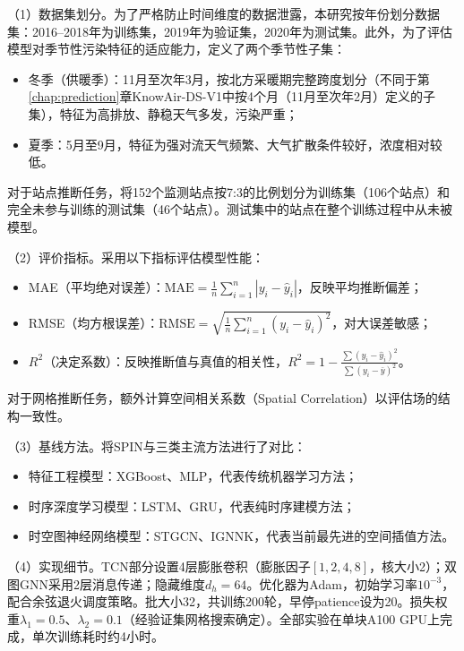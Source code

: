 （1）数据集划分。为了严格防止时间维度的数据泄露，本研究按年份划分数据集：2016--2018年为训练集，2019年为验证集，2020年为测试集。此外，为了评估模型对季节性污染特征的适应能力，定义了两个季节性子集：

\begin{itemize}
    \item 冬季（供暖季）：11月至次年3月，按北方采暖期完整跨度划分（不同于第\ref{chap:prediction}章KnowAir-DS-V1中按4个月（11月至次年2月）定义的子集），特征为高排放、静稳天气多发，\PM 污染严重；
    \item 夏季：5月至9月，特征为强对流天气频繁、大气扩散条件较好，\PM 浓度相对较低。
\end{itemize}

对于站点推断任务，将152个监测站点按7:3的比例划分为训练集（106个站点）和完全未参与训练的测试集（46个站点）。测试集中的站点在整个训练过程中从未被模型。

（2）评价指标。采用以下指标评估模型性能：

\begin{itemize}
    \item MAE（平均绝对误差）：$\text{MAE} = \frac{1}{n}\sum_{i=1}^{n}|y_i - \hat{y}_i|$，反映平均推断偏差；
    \item RMSE（均方根误差）：$\text{RMSE} = \sqrt{\frac{1}{n}\sum_{i=1}^{n}(y_i - \hat{y}_i)^2}$，对大误差敏感；
    \item $R^2$（决定系数）：反映推断值与真值的相关性，$R^2 = 1 - \frac{\sum(y_i-\hat{y}_i)^2}{\sum(y_i-\bar{y})^2}$。
\end{itemize}

对于网格推断任务，额外计算空间相关系数（Spatial Correlation）以评估场的结构一致性。

（3）基线方法。将SPIN与三类主流方法进行了对比：

\begin{itemize}
    \item 特征工程模型：XGBoost\citep{chen2016xgboost}、MLP，代表传统机器学习方法；
    \item 时序深度学习模型：LSTM\citep{hochreiter1997long}、GRU\citep{cho2014learning}，代表纯时序建模方法；
    \item 时空图神经网络模型：STGCN\citep{yu2018spatio}、IGNNK\citep{wu2021inductive}，代表当前最先进的空间插值方法。
\end{itemize}

（4）实现细节。TCN部分设置4层膨胀卷积（膨胀因子$[1,2,4,8]$，核大小2）；双图GNN采用2层消息传递；隐藏维度$d_h=64$。优化器为Adam，初始学习率$10^{-3}$，配合余弦退火调度策略。批大小32，共训练200轮，早停patience设为20。损失权重$\lambda_1=0.5$、$\lambda_2=0.1$（经验证集网格搜索确定）。全部实验在单块A100 GPU上完成，单次训练耗时约4小时。


